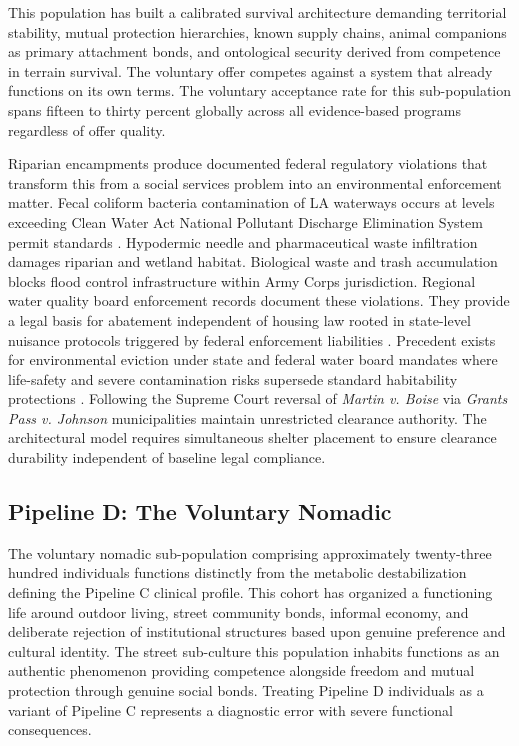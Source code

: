 \documentclass[12pt, letterpaper]{article}
\begin{document}
This population has built a calibrated survival architecture demanding territorial stability, mutual protection hierarchies, known supply chains, animal companions as primary attachment bonds, and ontological security derived from competence in terrain survival. The voluntary offer competes against a system that already functions on its own terms. The voluntary acceptance rate for this sub-population spans fifteen to thirty percent globally across all evidence-based programs regardless of offer quality.

Riparian encampments produce documented federal regulatory violations that transform this from a social services problem into an environmental enforcement matter. Fecal coliform bacteria contamination of LA waterways occurs at levels exceeding Clean Water Act National Pollutant Discharge Elimination System permit standards \citep{clean_water_act_1972}. Hypodermic needle and pharmaceutical waste infiltration damages riparian and wetland habitat. Biological waste and trash accumulation blocks flood control infrastructure within Army Corps jurisdiction. Regional water quality board enforcement records document these violations. They provide a legal basis for abatement independent of housing law rooted in state-level nuisance protocols triggered by federal enforcement liabilities \citep{clean_water_act_1972}. Precedent exists for environmental eviction under state and federal water board mandates where life-safety and severe contamination risks supersede standard habitability protections \citep{epa_encampment_abatement_2023}. Following the Supreme Court reversal of \textit{Martin v. Boise} via \textit{Grants Pass v. Johnson} municipalities maintain unrestricted clearance authority. The architectural model requires simultaneous shelter placement to ensure clearance durability independent of baseline legal compliance.

\subsection{Pipeline D: The Voluntary Nomadic}

The voluntary nomadic sub-population comprising approximately twenty-three hundred individuals functions distinctly from the metabolic destabilization defining the Pipeline C clinical profile. This cohort has organized a functioning life around outdoor living, street community bonds, informal economy, and deliberate rejection of institutional structures based upon genuine preference and cultural identity. The street sub-culture this population inhabits functions as an authentic phenomenon providing competence alongside freedom and mutual protection through genuine social bonds. Treating Pipeline D individuals as a variant of Pipeline C represents a diagnostic error with severe functional consequences.
\end{document}
